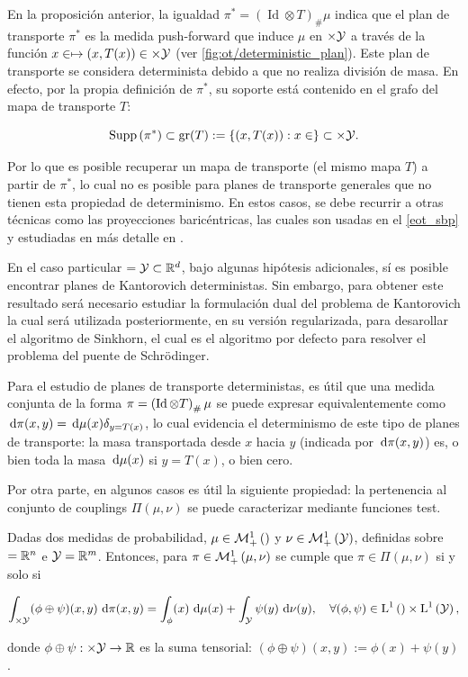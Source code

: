 En la proposición anterior, la igualdad $\pi^* = (\operatorname{Id}\otimes T)_\#\mu$ indica que el plan de transporte $\pi^*$ es la medida push-forward que induce $\mu$ en $\times\mathcal{Y}$ a través de la función $x\in\mapsto (x,T(x))\in\times\mathcal{Y}$ (ver \autoref{fig:ot/deterministic_plan}). Este plan de transporte se considera determinista debido a que no realiza división de masa. En efecto, por la propia definición de $\pi^*$, su soporte está contenido en el grafo del mapa de transporte $T$:

\begin{equation*}
	\operatorname{Supp}\left(\pi^*\right)
	\subset \operatorname{gr}(T) := \{(x,T(x)) : x\in\}
	\subset \times\mathcal{Y}.
\end{equation*}

Por lo que es posible recuperar un mapa de transporte (el mismo mapa $T$) a partir de $\pi^*$, lo cual no es posible para planes de transporte generales que no tienen esta propiedad de determinismo. En estos casos, se debe recurrir a otras técnicas como las proyecciones baricéntricas, las cuales son usadas en el \autoref{eot_sbp} y estudiadas en más detalle en \cite{peyré2020computational}.

En el caso particular $=\mathcal{Y}\subset\mathbb{R}^d$, bajo algunas hipótesis adicionales, sí es posible encontrar planes de Kantorovich deterministas. Sin embargo, para obtener este resultado será necesario estudiar la formulación dual del problema de Kantorovich la cual será utilizada posteriormente, en su versión regularizada, para desarollar el algoritmo de Sinkhorn, el cual es el algoritmo por defecto para resolver el problema del puente de Schrödinger.

Para el estudio de planes de transporte deterministas, es útil que una medida conjunta de la forma $\pi = \left(\operatorname{Id}\otimes T\right)_\#\mu$ se puede expresar equivalentemente como $\,\operatorname{d}\!\pi(x,y) = \,\operatorname{d}\!\mu(x)\delta_{y=T(x)}$, lo cual evidencia el determinismo de este tipo de planes de transporte: la masa transportada desde $x$ hacia $y$ (indicada por $\,\operatorname{d}\!\pi(x,y)$) es, o bien toda la masa $\,\operatorname{d}\!\mu(x)$ si $y=T(x)$, o bien cero. 

Por otra parte, en algunos casos es útil la siguiente propiedad: la pertenencia al conjunto de couplings $\Pi(\mu,\nu)$ se puede caracterizar mediante funciones test.

\begin{prop}
	Dadas dos medidas de probabilidad, $\mu\in\mathcal{M}_+^1\left(\right)$ y $\nu\in\mathcal{M}_+^1\left(\mathcal{Y}\right)$, definidas sobre $=\mathbb{R}^n$ e $\mathcal{Y}=\mathbb{R}^m$. Entonces, para $\pi\in\mathcal{M}_+^1\left(\mu,\nu\right)$ se cumple que $\pi\in\Pi(\mu,\nu)$ si y solo si

	\begin{equation*}
		\int_{\times\mathcal{Y}} (\phi\oplus\psi)(x,y)\,\operatorname{d}\!\pi(x,y) =
		\int_ \phi(x)\,\operatorname{d}\!\mu(x) + \int_{\mathcal{Y}} \psi(y)\,\operatorname{d}\!\nu(y),
		\quad\forall (\phi,\psi)\in \operatorname{L}^{1}\left(\right)\times \operatorname{L}^{1}\left(\mathcal{Y}\right),
	\end{equation*}

	donde $\phi\oplus\psi:\times\mathcal{Y}\to\mathbb{R}$ es la suma tensorial: $(\phi\oplus\psi)(x,y):=\phi(x)+\psi(y)$.
\end{prop}

